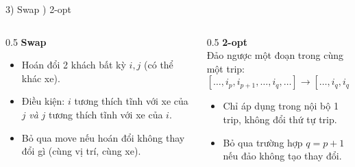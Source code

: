 \documentclass[aspectratio=169]{beamer}
\begin{document}
\begin{frame}{3) Swap ) 2-opt}
  \begin{columns}[T]
    \begin{column}{0.5\textwidth}
      \textbf{Swap}
      \begin{itemize}
        \item \small Hoán đổi 2 khách bất kỳ $i, j$ (có thể khác xe).
        \item \small Điều kiện: $i$ tương thích tĩnh với xe của $j$ \emph{và} $j$ tương thích tĩnh với xe của $i$.
        \item \small Bỏ qua move nếu hoán đổi không thay đổi gì (cùng vị trí, cùng xe).
      \end{itemize}
    \end{column}
    \begin{column}{0.5\textwidth}
      \textbf{2-opt}\\
      \small Đảo ngược một đoạn trong cùng một trip:
      $$[\ldots,i_p,i_{p+1},\ldots,i_q,\ldots] \to [\ldots,i_q,i_{q-1},\ldots,i_p,\ldots]$$
      \begin{itemize}
        \item \small Chỉ áp dụng trong nội bộ 1 trip, không đổi thứ tự trip.
        \item \small Bỏ qua trường hợp $q = p+1$ nếu đảo không tạo thay đổi.
      \end{itemize}
    \end{column}
  \end{columns}
\end{frame}
\end{document}
